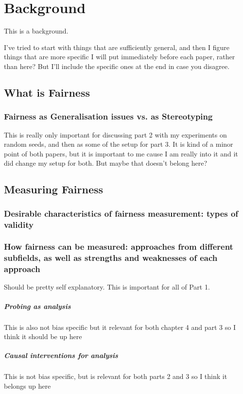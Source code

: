 \chapter{Background}\label{chapter:background}
This is a background.

I've tried to start with things that are sufficiently general, and then I figure things that are more specific I will put immediately before each paper, rather than here? But I'll include the specific ones at the end in case you disagree.

\section{What is Fairness}
\subsection{Fairness as Generalisation issues vs. as Stereotyping}
This is really only important for discussing part 2 with my experiments on random seeds, and then as some of the setup for part 3. It is kind of a minor point of both papers, but it is important to me cause I am really into it and it did change my setup for both. But maybe that doesn't belong here?

\section{Measuring Fairness}
\subsection{Desirable characteristics of fairness measurement: types of validity}

\subsection{How fairness can be measured: approaches from different subfields, as well as strengths and weaknesses of each approach} Should be pretty self explanatory. This is important for all of Part 1.

\paragraph{Probing as analysis}
This is also not bias specific but it relevant for both chapter 4 and part 3 so I think it should be up here

\paragraph{Causal interventions for analysis}
This is not bias specific, but is relevant for both parts 2 and 3 so I think it belongs up here


